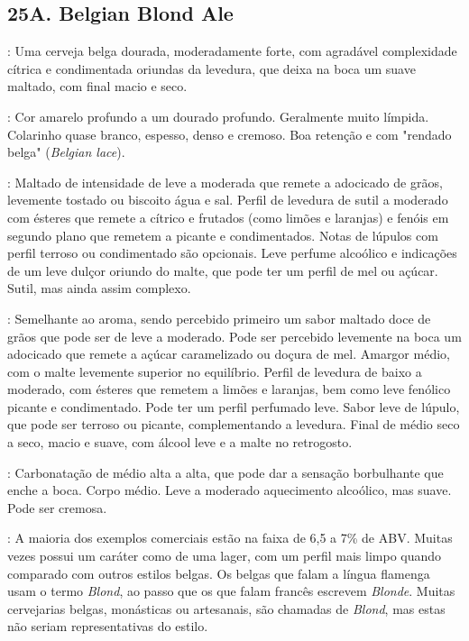 \subsection*{25A. Belgian Blond Ale}

: Uma cerveja belga dourada, moderadamente forte, com agradável complexidade cítrica e condimentada oriundas da levedura, que deixa na boca um suave maltado, com final macio e seco.

: Cor amarelo profundo a um dourado profundo. Geralmente muito límpida. Colarinho quase branco, espesso, denso e cremoso. Boa retenção e com "rendado belga" (\textit{Belgian lace}).

: Maltado de intensidade de leve a moderada que remete a adocicado de grãos, levemente tostado ou biscoito água e sal. Perfil de levedura de sutil a moderado com ésteres que remete a cítrico e frutados (como limões e laranjas) e fenóis em segundo plano que remetem a picante e condimentados. Notas de lúpulos com perfil terroso ou condimentado são opcionais. Leve perfume alcoólico e indicações de um leve dulçor oriundo do malte, que pode ter um perfil de mel ou açúcar. Sutil, mas ainda assim complexo.

: Semelhante ao aroma, sendo percebido primeiro um sabor maltado doce de grãos que pode ser de leve a moderado. Pode ser percebido levemente na boca um adocicado que remete a açúcar caramelizado ou doçura de mel. Amargor médio, com o malte levemente superior no equilíbrio. Perfil de levedura de baixo a moderado, com ésteres que remetem a limões e laranjas, bem como leve fenólico picante e condimentado. Pode ter um perfil perfumado leve. Sabor leve de lúpulo, que pode ser terroso ou picante, complementando a levedura. Final de médio seco a seco, macio e suave, com álcool leve e a malte no retrogosto.

: Carbonatação de médio alta a alta, que pode dar a sensação borbulhante que enche a boca. Corpo médio. Leve a moderado aquecimento alcoólico, mas suave. Pode ser cremosa.

: A maioria dos exemplos comerciais estão na faixa de 6,5 a 7\% de ABV. Muitas vezes possui um caráter como de uma lager, com um perfil mais limpo quando comparado com outros estilos belgas. Os belgas que falam a língua flamenga usam o termo \textit{Blond}, ao passo que os que falam francês escrevem \textit{Blonde}. Muitas cervejarias belgas, monásticas ou artesanais, são chamadas de \textit{Blond}, mas estas não seriam representativas do estilo.

